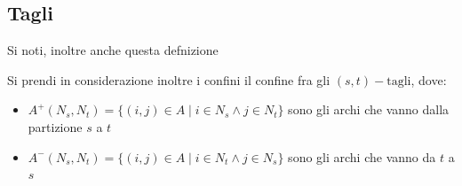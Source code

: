 \subsection{Tagli}


Si noti, inoltre anche questa defnizione

Si prendi in considerazione inoltre i confini il confine fra gli $(s,t)-\text{tagli}$, dove:
\begin{itemize}
  \item $A^+(N_s, N_t) = \{(i,j) \in A \mid i \in N_s \land j \in N_t\}$ sono gli archi che vanno dalla partizione $s$ a $t$
  \item $ A^-(N_s,N_t)=\{(i,j)\in A\mid i\in N_t\land j\in N_s\} $ sono gli archi che vanno da $t$ a $s$
\end{itemize}



